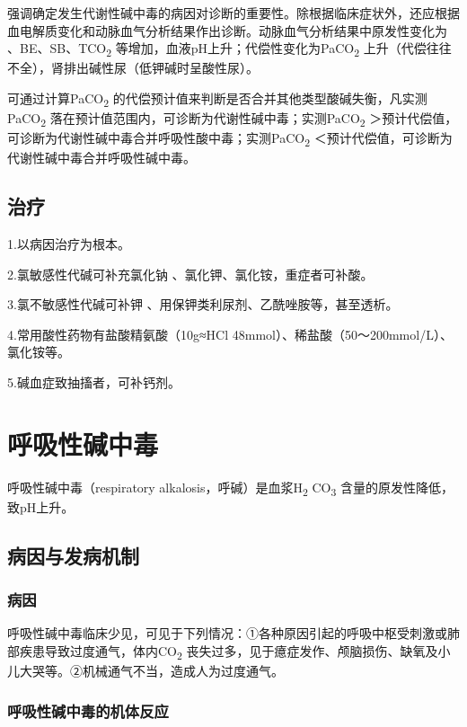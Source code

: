 强调确定发生代谢性碱中毒的病因对诊断的重要性。除根据临床症状外，还应根据血电解质变化和动脉血气分析结果作出诊断。动脉血气分析结果中原发性变化为{}
、BE、SB、TCO\textsubscript{2}
等增加，血液pH上升；代偿性变化为PaCO\textsubscript{2}
上升（代偿往往不全），肾排出碱性尿（低钾碱时呈酸性尿）。

可通过计算PaCO\textsubscript{2}
的代偿预计值来判断是否合并其他类型酸碱失衡，凡实测PaCO\textsubscript{2}
落在预计值范围内，可诊断为代谢性碱中毒；实测PaCO\textsubscript{2}
＞预计代偿值，可诊断为代谢性碱中毒合并呼吸性酸中毒；实测PaCO\textsubscript{2}
＜预计代偿值，可诊断为代谢性碱中毒合并呼吸性碱中毒。

\subsection{治疗}

1.以病因治疗为根本。

2.氯敏感性代碱可补充氯化钠 、氯化钾、氯化铵，重症者可补酸。

3.氯不敏感性代碱可补钾 、用保钾类利尿剂、乙酰唑胺等，甚至透析。

4.常用酸性药物有盐酸精氨酸（10g≈HCl
48mmol）、稀盐酸（50～200mmol/L）、氯化铵等。

5.碱血症致抽搐者，可补钙剂。

\protect\hypertarget{text00207.html}{}{}

\section{呼吸性碱中毒}

呼吸性碱中毒（respiratory alkalosis，呼碱）是血浆H\textsubscript{2}
CO\textsubscript{3} 含量的原发性降低，致pH上升。

\subsection{病因与发病机制}

\subsubsection{病因}

呼吸性碱中毒临床少见，可见于下列情况：①各种原因引起的呼吸中枢受刺激或肺部疾患导致过度通气，体内CO\textsubscript{2}
丧失过多，见于癔症发作、颅脑损伤、缺氧及小儿大哭等。②机械通气不当，造成人为过度通气。

\subsubsection{呼吸性碱中毒的机体反应}

